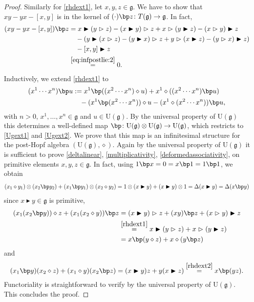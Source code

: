 \documentclass[10pt]{article}
\theoremstyle{definition}
\newcommand{\wt}{\vartriangleright}
\newcommand{\bt}{\blacktriangleright}
\renewcommand{\wp}{\diamond}
\begin{document}
\begin{proof}
Similarly for \eqref{rhdext1}, let $x,y,z\in\mathfrak{g}$. We have to show that $xy-yx-[x,y]$ is in the kernel of $(\cdot) \bp z\colon T(\mathfrak{g})\to\mathfrak{g}$. In fact,
\begin{align*}
    (xy-yx-[x,y]) \bp z
    &=x\bt(y \wt z)-(x\bt y) \wt z
    +x \wt (y\bt z)-(x \wt y)\bt z\\
    &\quad-(y\bt(x \wt z)-(y\bt x) \wt z
    +y \wt (x\bt z)-(y \wt x)\bt z)\\
    &\quad-[x,y]\bt z\\
    &\overset{\eqref{eq:infpostlie:2}}{=}0.
\end{align*}
Inductively, we extend \eqref{rhdext1} to
\begin{equation}\label{Ugext1}
\begin{split}
    (x^1\cdots x^n) \bp u&:=x^1 \bp((x^2\cdots x^n)\wp u)
+x^1\wp ((x^2\cdots x^n) \bp u)\\
&\quad-(x^1 \bp(x^2\cdots x^n))\wp u
-(x^1\wp(x^2\cdots x^n)) \bp u,
\end{split}
\end{equation}
with $n>0$, $x^1,\ldots,x^n\in\mathfrak{g}$ and $u\in \mathrm{U}(\mathfrak{g})$. By the universal property of $\mathrm{U}(\mathfrak{g})$ this determines a well-defined map $ \bp\colon \mathrm{U}(\mathfrak{g})\otimes \mathrm{U}(\mathfrak{g})\to \mathrm{U}(\mathfrak{g})$, which restricts to \eqref{Ugext1} and \eqref{Ugext2}. We prove that this map is an infinitesimal structure for the post-Hopf algebra $(\mathrm{U}(\mathfrak{g}),\wp )$. Again by the universal property of $\mathrm{U}(\mathfrak{g})$ it is sufficient to prove \eqref{deltalinear}, \eqref{multiplicativity}, \eqref{deformedassociativity},
on primitive elements $x,y,z\in\mathfrak{g}$. In fact, using $1 \bp x=0=x \bp 1=1 \bp 1$, we obtain
\begin{align*}
    (x_1\wp  y_1)\otimes(x_2 \bp y_2)+(x_1 \bp y_1)\otimes(x_2\wp y_2)
    =1\otimes(x\bt y)+(x\bt y)\otimes 1
    =\Delta(x\bt y)=\Delta(x\bp y)
\end{align*}
since $x\bt y\in\mathfrak{g}$ is primitive,
\begin{align*}
    (x_1(x_2 \bp y))\wp z
    +(x_1(x_2\wp y)) \bp z
    &=(x\bt y) \wt z
    +(xy) \bp z
    +(x \wt y)\bt z\\
    &\overset{\eqref{rhdext1}}{=}x\bt(y \wt z)
    +x \wt(y\bt z)\\&=x\bp(y \wp z)
    +x \wp(y\bp z)
\end{align*}
and
\begin{align*}
    (x_1 \bp y)(x_2\wp z)
    +(x_1\wp y)(x_2 \bp z)
    =(x\bt y)z+y(x\bt z)
    \overset{\eqref{rhdext2}}{=}x\bp(yz).
\end{align*}
Functoriality is straightforward to verify by the universal property of $\mathrm{U}(\mathfrak{g})$. This concludes the proof.
\end{proof}
\end{document}
